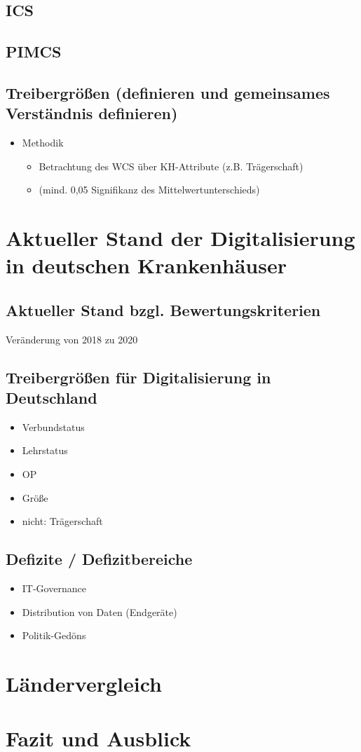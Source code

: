 	\subsection{ICS}
	\subsection{PIMCS}
	\subsection{Treibergrößen (definieren und gemeinsames Verständnis definieren)}
	\begin{itemize}
		\item Methodik
		\begin{itemize}
			\item Betrachtung des WCS über KH-Attribute (z.B. Trägerschaft)
			\item (mind. 0,05 Signifikanz des Mittelwertunterschieds)
		\end{itemize}
	\end{itemize}
\section{Aktueller Stand der Digitalisierung in deutschen Krankenhäuser}
	\subsection{Aktueller Stand bzgl. Bewertungskriterien}
		Veränderung von 2018 zu 2020
	\subsection{Treibergrößen für Digitalisierung in Deutschland}
	\begin{itemize}
		\item Verbundstatus \parencite{cresswell2013}
		\item Lehrstatus
		\item OP
		\item Größe \parencite{cresswell2013}
		\item nicht: Trägerschaft \parencite{cresswell2013}
	\end{itemize}
	\subsection{Defizite / Defizitbereiche}
	\begin{itemize}
		\item IT-Governance
		\item Distribution von Daten (Endgeräte)
		\item Politik-Gedöns
	\end{itemize}
\section{Ländervergleich}
\section{Fazit und Ausblick}

\newpage
{}
\setcounter{page}{3}
\printbibliography
{}

